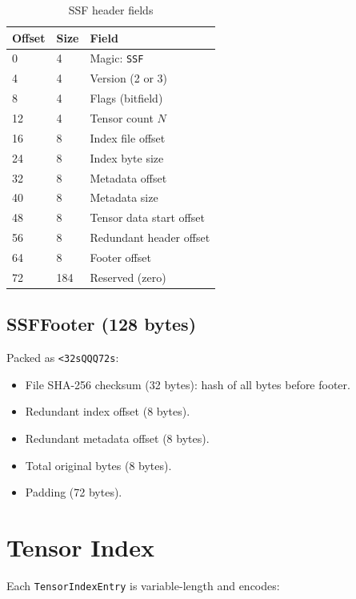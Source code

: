 \documentclass[11pt,a4paper,openright]{book}
\begin{document}
\begin{table}[ht]
	\centering
	\caption{SSF header fields}
	\begin{tabular}{llp{6cm}}
		\toprule
		Offset & Size & Field                    \\
		\midrule
		0      & 4    & Magic: \texttt{SSF\x02}  \\
		4      & 4    & Version (2 or 3)         \\
		8      & 4    & Flags (bitfield)         \\
		12     & 4    & Tensor count $N$         \\
		16     & 8    & Index file offset        \\
		24     & 8    & Index byte size          \\
		32     & 8    & Metadata offset          \\
		40     & 8    & Metadata size            \\
		48     & 8    & Tensor data start offset \\
		56     & 8    & Redundant header offset  \\
		64     & 8    & Footer offset            \\
		72     & 184  & Reserved (zero)          \\
		\bottomrule
	\end{tabular}
\end{table}

\subsection{SSFFooter (128 bytes)}

Packed as \texttt{<32sQQQ72s}:
\begin{itemize}
	\item File SHA-256 checksum (32 bytes): hash of all bytes before footer.
	\item Redundant index offset (8 bytes).
	\item Redundant metadata offset (8 bytes).
	\item Total original bytes (8 bytes).
	\item Padding (72 bytes).
\end{itemize}

\section{Tensor Index}

Each \texttt{TensorIndexEntry} is variable-length and encodes:
\end{document}
